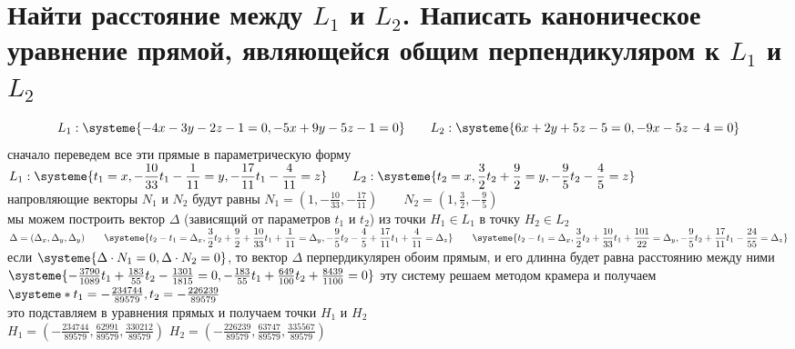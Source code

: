 \documentclass{article}
\newcommand{\ds}{\displaystyle}
\begin{document}
  \section{Найти расстояние между $L_1$ и $L_2$. Написать каноническое уравнение прямой, являющейся общим перпендикуляром к $L_1$ и $L_2$}
  \[
    L_1: \systeme{
      -4x-3y-2z-1 = 0,
      -5x+9y-5z-1 = 0
    } \qquad
    L_2: \systeme{
      6x+2y+5z-5 = 0,
      -9x-5z-4 = 0
    }
  \]
  сначало переведем все эти прямые в параметрическую форму \\
  \( \ds
    L_1: \systeme{
      t_1 = x,
      -\frac{10}{33}t_1 - \frac{1}{11} = y,
      -\frac{17}{11}t_1 - \frac{4}{11} = z
    } \qquad
    L_2: \systeme{
      t_2 = x,
      \frac{3}{2}t_2 + \frac{9}{2} = y,
      -\frac{9}{5}t_2 - \frac{4}{5} = z
    }
  \) \\
  напровляющие векторы $N_1$ и $N_2$ будут равны
  $\ds N_1 = \left(1, -\frac{10}{33}, -\frac{17}{11}\right) \qquad N_2 = \left(1, \frac{3}{2}, -\frac{9}{5}\right)$ \\
  мы можем построить вектор $\Delta$ (зависящий от параметров $t_1$ и $t_2$) из точки $H_1 \in L_1$ в точку $H_2 \in L_2$ \\
  \(\ds
    \Delta = (\Delta_x, \Delta_y, \Delta_y) \qquad
    \systeme{
      t_2 - t_1 = \Delta_x,
      \frac{3}{2}t_2 + \frac{9}{2} + \frac{10}{33}t_1 + \frac{1}{11} = \Delta_y,
      -\frac{9}{5}t_2 - \frac{4}{5} + \frac{17}{11}t_1 + \frac{4}{11} = \Delta_z
    } \qquad \systeme{
      t_2 - t_1 = \Delta_x,
      \frac{3}{2}t_2 + \frac{10}{33}t_1 + \frac{101}{22} = \Delta_y,
      -\frac{9}{5}t_2 + \frac{17}{11}t_1 - \frac{24}{55} = \Delta_z
    }
  \) \\
  если $\systeme{\Delta \cdot N_1 = 0, \Delta \cdot N_2 = 0}$, то вектор $\Delta$ перпердикулярен обоим прямым,
  и его длинна будет равна расстоянию между ними \\
  \(
    \systeme{
      -\frac{3790}{1089}t_1 + \frac{183}{55}t_2 - \frac{1301}{1815} = 0,
      -\frac{183}{55}t_1 + \frac{649}{100}t_2 + \frac{8439}{1100} = 0
    }
  \) \qquad
  эту систему решаем методом крамера и получаем
  $\systeme*{t_1=-\frac{234744}{89579}, t_2=-\frac{226239}{89579}}$ \\
  это подставляем в уравнения прямых и получаем точки $H_1$ и $H_2$ \\
  $\ds H_1 = \left(-\frac{234744}{89579}, \frac{62991}{89579}, \frac{330212}{89579} \right)$ \qquad
  $\ds H_2 = \left(-\frac{226239}{89579}, \frac{63747}{89579}, \frac{335567}{89579} \right)$ \\
\end{document}
